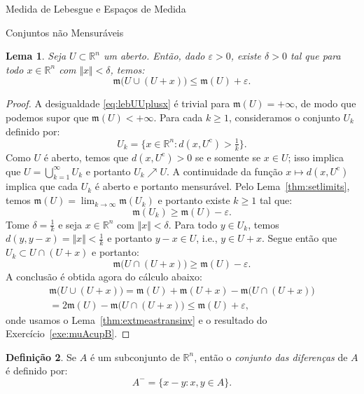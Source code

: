 \documentclass[oneside,final,11pt]{amsbook}
\newcommand{\R}{\mathds R}
\newcommand{\leb}{\mathfrak m}
\newcommand{\compl}{\mathrm c}
\theoremstyle{remark}\newtheorem{exercise}{Exercício}[chapter]
\theoremstyle{remark}\newtheorem{*exercise}[exercise]{\hbox to 0pt{\hskip 0pt minus 1fil*}Exercício}
\theoremstyle{definition}\newtheorem{exdefin}{Definição}[chapter]
\theoremstyle{plain}\newtheorem{teo}{Teorema}[section]
\theoremstyle{plain}\newtheorem{lem}[teo]{Lema}
\theoremstyle{plain}\newtheorem{prop}[teo]{Proposição}
\theoremstyle{plain}\newtheorem{cor}[teo]{Corolário}
\theoremstyle{definition}\newtheorem{defin}[teo]{Definição}
\theoremstyle{remark}\newtheorem{rem}[teo]{Observação}
\theoremstyle{definition}\newtheorem{notation}[teo]{Notação}
\theoremstyle{definition}\newtheorem{convention}[teo]{Convenção}
\theoremstyle{definition}\newtheorem{example}[teo]{Exemplo}
\numberwithin{section}{chapter}
\numberwithin{equation}{section}
\begin{document}
\begin{chapter}{Medida de Lebesgue e Espaços de Medida}
\begin{section}{Conjuntos não Mensuráveis}
\begin{lem}\label{thm:UquaseUmaisx}
Seja $U\subset\R^n$ um aberto. Então, dado $\varepsilon>0$, existe $\delta>0$ tal que para
todo $x\in\R^n$ com $\Vert x\Vert<\delta$, temos:
\begin{equation}\label{eq:lebUUplusx}
\leb\big(U\cup(U+x)\big)\le\leb(U)+\varepsilon.
\end{equation}
\end{lem}
\begin{proof}
A desigualdade \eqref{eq:lebUUplusx} é trivial para $\leb(U)=+\infty$, de modo que podemos supor
que $\leb(U)<+\infty$. Para cada $k\ge1$, consideramos o conjunto $U_k$ definido por:
\[U_k=\big\{x\in\R^n:d(x,U^\compl)>\tfrac1k\big\}.\]
Como $U$ é aberto, temos que $d(x,U^\compl)>0$ se e somente se $x\in U$; isso implica
que $U=\bigcup_{k=1}^\infty U_k$ e portanto $U_k\nearrow U$. A continuidade da função $x\mapsto d(x,U^\compl)$
implica que cada $U_k$ é aberto e portanto mensurável. Pelo Lema~\ref{thm:setlimits},
temos $\leb(U)=\lim_{k\to\infty}\leb(U_k)$ e portanto existe $k\ge1$ tal que:
\[\leb(U_k)\ge\leb(U)-\varepsilon.\]
Tome $\delta=\frac1k$ e seja $x\in\R^n$ com $\Vert x\Vert<\delta$. Para todo $y\in U_k$, temos
$d(y,y-x)=\Vert x\Vert<\frac1k$ e portanto $y-x\in U$, i.e., $y\in U+x$. Segue então que $U_k\subset U\cap(U+x)$
e portanto:
\[\leb\big(U\cap(U+x)\big)\ge\leb(U)-\varepsilon.\]
A conclusão é obtida agora do cálculo abaixo:
\begin{multline*}
\leb\big(U\cup(U+x)\big)=\leb(U)+\leb(U+x)-\leb\big(U\cap(U+x)\big)\\
=2\leb(U)-\leb\big(U\cap(U+x)\big)\le\leb(U)+\varepsilon,
\end{multline*}
onde usamos o Lema~\ref{thm:extmeastransinv} e o resultado do Exercício~\ref{exe:muAcupB}.
\end{proof}

\begin{defin}
Se $A$ é um subconjunto de $\R^n$, então o {\em conjunto das diferenças\/}
de $A$ é definido por:
\[A^-=\big\{x-y:x,y\in A\big\}.\]
\end{defin}


\end{section}
\end{chapter}
\end{document}
